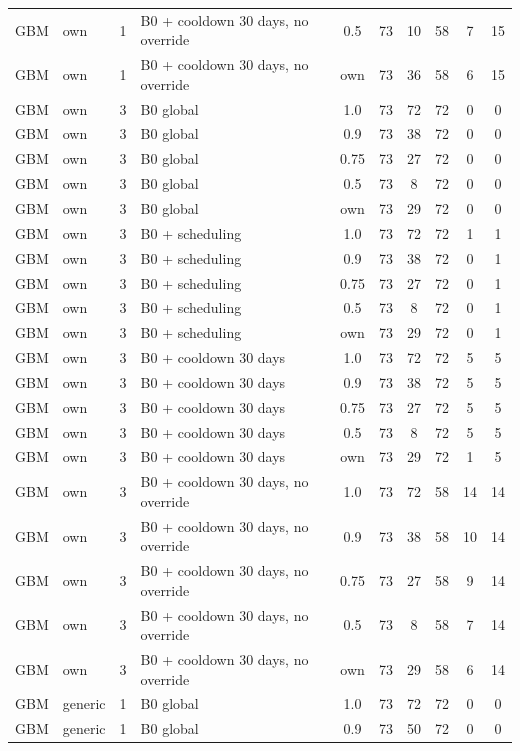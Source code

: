 \documentclass[10pt,onecolumn,letterpaper]{article}
\begin{document}
\begin{longtable}{lllp{4.4cm}cccccc}
GBM & own & 1 & B0 + cooldown 30 days, no override & 0.5 & 73 & 10 & 58 & 7 & 15 \\
GBM & own & 1 & B0 + cooldown 30 days, no override & own & 73 & 36 & 58 & 6 & 15 \\
GBM & own & 3 & B0 global & 1.0 & 73 & 72 & 72 & 0 & 0 \\
GBM & own & 3 & B0 global & 0.9 & 73 & 38 & 72 & 0 & 0 \\
GBM & own & 3 & B0 global & 0.75 & 73 & 27 & 72 & 0 & 0 \\
GBM & own & 3 & B0 global & 0.5 & 73 & 8 & 72 & 0 & 0 \\
GBM & own & 3 & B0 global & own & 73 & 29 & 72 & 0 & 0 \\
GBM & own & 3 & B0 + scheduling & 1.0 & 73 & 72 & 72 & 1 & 1 \\
GBM & own & 3 & B0 + scheduling & 0.9 & 73 & 38 & 72 & 0 & 1 \\
GBM & own & 3 & B0 + scheduling & 0.75 & 73 & 27 & 72 & 0 & 1 \\
GBM & own & 3 & B0 + scheduling & 0.5 & 73 & 8 & 72 & 0 & 1 \\
GBM & own & 3 & B0 + scheduling & own & 73 & 29 & 72 & 0 & 1 \\
GBM & own & 3 & B0 + cooldown 30 days & 1.0 & 73 & 72 & 72 & 5 & 5 \\
GBM & own & 3 & B0 + cooldown 30 days & 0.9 & 73 & 38 & 72 & 5 & 5 \\
GBM & own & 3 & B0 + cooldown 30 days & 0.75 & 73 & 27 & 72 & 5 & 5 \\
GBM & own & 3 & B0 + cooldown 30 days & 0.5 & 73 & 8 & 72 & 5 & 5 \\
GBM & own & 3 & B0 + cooldown 30 days & own & 73 & 29 & 72 & 1 & 5 \\
GBM & own & 3 & B0 + cooldown 30 days, no override & 1.0 & 73 & 72 & 58 & 14 & 14 \\
GBM & own & 3 & B0 + cooldown 30 days, no override & 0.9 & 73 & 38 & 58 & 10 & 14 \\
GBM & own & 3 & B0 + cooldown 30 days, no override & 0.75 & 73 & 27 & 58 & 9 & 14 \\
GBM & own & 3 & B0 + cooldown 30 days, no override & 0.5 & 73 & 8 & 58 & 7 & 14 \\
GBM & own & 3 & B0 + cooldown 30 days, no override & own & 73 & 29 & 58 & 6 & 14 \\
GBM & generic & 1 & B0 global & 1.0 & 73 & 72 & 72 & 0 & 0 \\
GBM & generic & 1 & B0 global & 0.9 & 73 & 50 & 72 & 0 & 0 \\

\end{longtable}
\end{document}
